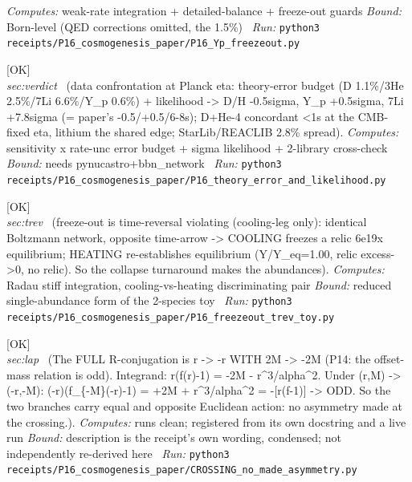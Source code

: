 \begin{description}
\emph{Computes:} weak-rate integration + detailed-balance + freeze-out guards
 \emph{Bound:} Born-level (QED corrections omitted, the 1.5\%)
\ \emph{Run:} \texttt{python3 receipts/P16\_cosmogenesis\_paper/P16\_Yp\_freezeout.py}
\item[\rcptlabel{P16_theory_error_and_likelihood}{P16R12}\textbf{P16R12}\quad\texttt{P16\_theory\_error\_and\_likelihood}]\hfill\textsf{[OK]}\\
\textit{sec:verdict} \ (data confrontation at Planck eta: theory-error budget (D 1.1\%/3He 2.5\%/7Li 6.6\%/Y\_p 0.6\%) + likelihood -> D/H -0.5sigma, Y\_p +0.5sigma, 7Li +7.8sigma (= paper's -0.5/+0.5/6-8s); D+He-4 concordant <1s at the CMB-fixed eta, lithium the shared edge; StarLib/REACLIB 2.8\% spread). 
\emph{Computes:} sensitivity x rate-unc error budget + sigma likelihood + 2-library cross-check
 \emph{Bound:} needs pynucastro+bbn\_network
\ \emph{Run:} \texttt{python3 receipts/P16\_cosmogenesis\_paper/P16\_theory\_error\_and\_likelihood.py}
\item[\rcptlabel{P16_freezeout_trev_toy}{P16R13}\textbf{P16R13}\quad\texttt{P16\_freezeout\_trev\_toy}]\hfill\textsf{[OK]}\\
\textit{sec:trev} \ (freeze-out is time-reversal violating (cooling-leg only): identical Boltzmann network, opposite time-arrow -> COOLING freezes a relic 6e19x equilibrium; HEATING re-establishes equilibrium (Y/Y\_eq=1.00, relic excess->0, no relic). So the collapse turnaround makes the abundances). 
\emph{Computes:} Radau stiff integration, cooling-vs-heating discriminating pair
 \emph{Bound:} reduced single-abundance form of the 2-species toy
\ \emph{Run:} \texttt{python3 receipts/P16\_cosmogenesis\_paper/P16\_freezeout\_trev\_toy.py}
\item[\rcptlabel{CROSSING_no_made_asymmetry}{P16R14}\textbf{P16R14}\quad\texttt{CROSSING\_no\_made\_asymmetry}]\hfill\textsf{[OK]}\\
\textit{sec:lap} \ (The FULL R-conjugation is r -> -r WITH 2M -> -2M (P14: the offset-mass relation is odd). Integrand: r(f(r)-1) = -2M - r\textasciicircum{}3/alpha\textasciicircum{}2. Under (r,M) -> (-r,-M): (-r)(f\_\{-M\}(-r)-1) = +2M + r\textasciicircum{}3/alpha\textasciicircum{}2 = -[r(f-1)] -> ODD. So the two branches carry equal and opposite Euclidean action: no asymmetry made at the crossing.). 
\emph{Computes:} runs clean; registered from its own docstring and a live run
 \emph{Bound:} description is the receipt's own wording, condensed; not independently re-derived here
\ \emph{Run:} \texttt{python3 receipts/P16\_cosmogenesis\_paper/CROSSING\_no\_made\_asymmetry.py}

\end{description}
